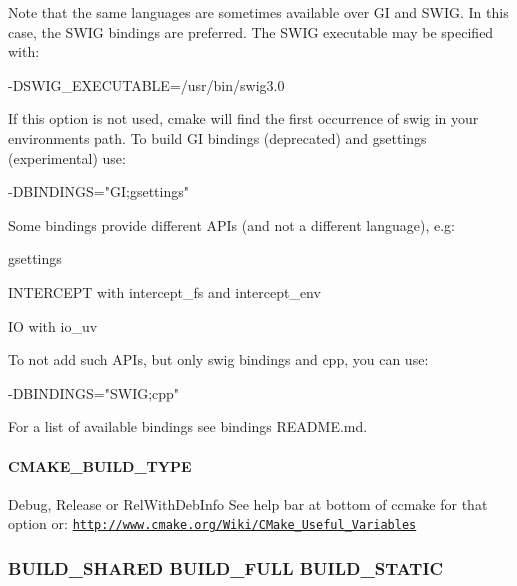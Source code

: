 Note that the same languages are sometimes available over GI and S\+W\+IG. In this case, the S\+W\+IG bindings are preferred. The S\+W\+IG executable may be specified with\+: \begin{DoxyVerb}-DSWIG_EXECUTABLE=/usr/bin/swig3.0
\end{DoxyVerb}


If this option is not used, cmake will find the first occurrence of {\ttfamily swig} in your environment\textquotesingle{}s path. To build GI bindings (deprecated) and gsettings (experimental) use\+: \begin{DoxyVerb}-DBINDINGS="GI;gsettings"
\end{DoxyVerb}


Some bindings provide different A\+P\+Is (and not a different language), e.\+g\+:


\begin{DoxyItemize}
\item {\ttfamily gsettings}
\item {\ttfamily I\+N\+T\+E\+R\+C\+E\+PT} with {\ttfamily intercept\+\_\+fs} and {\ttfamily intercept\+\_\+env}
\item {\ttfamily IO} with {\ttfamily io\+\_\+uv}
\end{DoxyItemize}

To not add such A\+P\+Is, but only {\ttfamily swig} bindings and {\ttfamily cpp}, you can use\+: \begin{DoxyVerb}-DBINDINGS="SWIG;cpp"
\end{DoxyVerb}


For a list of available bindings see binding\textquotesingle{}s R\+E\+A\+D\+ME.md.

\paragraph*{C\+M\+A\+K\+E\+\_\+\+B\+U\+I\+L\+D\+\_\+\+T\+Y\+PE}

{\ttfamily Debug}, {\ttfamily Release} or {\ttfamily Rel\+With\+Deb\+Info} See help bar at bottom of ccmake for that option or\+: \href{http://www.cmake.org/Wiki/CMake_Useful_Variables}{\tt http\+://www.\+cmake.\+org/\+Wiki/\+C\+Make\+\_\+\+Useful\+\_\+\+Variables}

\subsubsection*{B\+U\+I\+L\+D\+\_\+\+S\+H\+A\+R\+ED B\+U\+I\+L\+D\+\_\+\+F\+U\+LL B\+U\+I\+L\+D\+\_\+\+S\+T\+A\+T\+IC}

